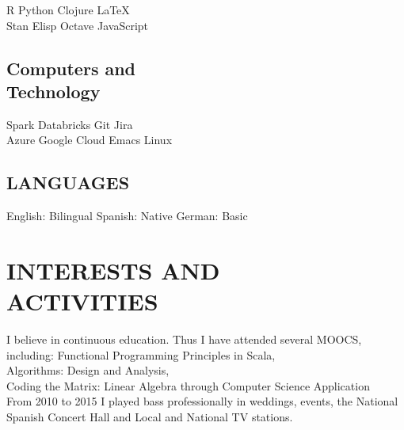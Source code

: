 \documentclass[]{deedy-resume-openfont}
\begin{document}
\begin{minipage}[t]{0.33\textwidth}
R \textbullet{} Python \textbullet{} Clojure \textbullet{} \LaTeX\ \\ 
Stan \textbullet{} Elisp \textbullet{} Octave \textbullet{} JavaScript \\

\sectionsep

\subsection{Computers and \\  Technology}

Spark \textbullet{} Databricks \textbullet{} Git \textbullet{} Jira \\
Azure  \textbullet{} Google Cloud \textbullet{} Emacs \textbullet{} Linux \\

\sectionsep

\subsection{LANGUAGES}

English: Bilingual \textbullet{} Spanish: Native \textbullet{} German: Basic \\

\sectionsep

\section{INTERESTS AND \\ ACTIVITIES} 
I believe in continuous education. Thus I have attended several MOOCS, including:
Functional Programming Principles in Scala,\\
Algorithms: Design and Analysis,\\
Coding the Matrix: Linear Algebra through Computer Science Application \\
\sectionsep
From 2010 to 2015 I played bass professionally in weddings, events, the National Spanish Concert Hall and Local and National TV stations.
\sectionsep


%
%

\end{minipage} 
\hfill
\end{document}
